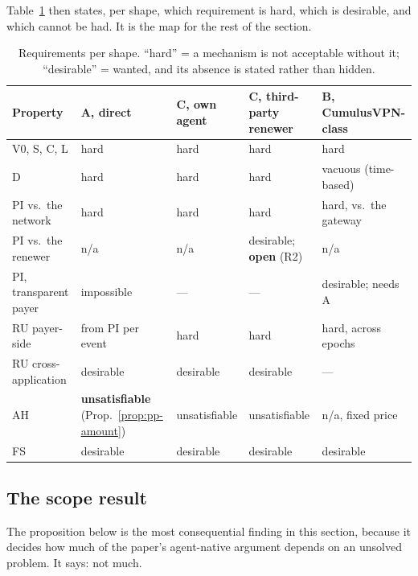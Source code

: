 Table~\ref{tab:pp-props} then states, per shape, which requirement is hard, which is desirable, and
which cannot be had. It is the map for the rest of the section.

\begin{table}[H]
\centering
\small
\caption{Requirements per shape. ``hard'' = a mechanism is not acceptable without it; ``desirable'' =
wanted, and its absence is stated rather than hidden.}
\label{tab:pp-props}
\begin{tabular}{@{}lllll@{}}
\toprule
\textbf{Property} & \textbf{A, direct} & \textbf{C, own agent} & \textbf{C, third-party renewer} & \textbf{B, CumulusVPN-class} \\
\midrule
V0, S, C, L & hard & hard & hard & hard \\
D & hard & hard & hard & vacuous (time-based) \\
PI vs.\ the network & hard & hard & hard & hard, vs.\ the gateway \\
PI vs.\ the renewer & n/a & n/a & desirable; \textbf{open} (R2) & n/a \\
PI, transparent payer & impossible & --- & --- & desirable; needs A \\
RU payer-side & from PI per event & hard & hard & hard, across epochs \\
RU cross-application & desirable & desirable & desirable & --- \\
AH & \textbf{unsatisfiable} (Prop.~\ref{prop:pp-amount}) & unsatisfiable & unsatisfiable & n/a, fixed price \\
FS & desirable & desirable & desirable & desirable \\
\bottomrule
\end{tabular}
\end{table}

\subsection{The scope result}
\label{sec:pp-scope}

The proposition below is the most consequential finding in this section, because it decides how much
of the paper's agent-native argument depends on an unsolved problem. It says: not much.

